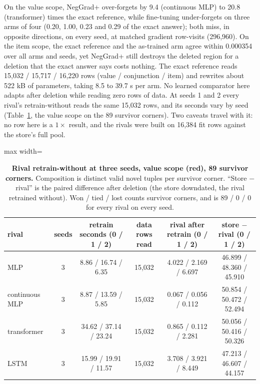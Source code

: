 \documentclass{article} %
\begin{document}
\noindent On the value scope, NegGrad+ over-forgets by 9.4 (continuous MLP) to 20.8 (transformer)
times the exact reference, while fine-tuning under-forgets on three arms of four (0.20, 1.00, 0.23
and 0.29 of the exact answer); both miss, in opposite directions, on every seed, at matched gradient
row-visits (296,960). On the item scope, the exact reference and the as-trained arm agree within
0.000354 over all arms and seeds, yet NegGrad+ still destroys the deleted region for a deletion
that the exact answer says costs nothing. The exact reference reads 15,032 / 15,717 / 16,220 rows
(value / conjunction / item) and rewrites about 522 kB of parameters, taking 8.5 to 39.7 s per
arm. No learned comparator here adapts after deletion while reading zero rows of data.
At seeds 1 and 2 every rival's retrain-without reads the same 15,032 rows, and its seconds vary by
seed (Table~\ref{tab:rivals-del-seeds}, the value scope on the 89 survivor corners). Two caveats
travel with it: no row here is a $1\times$ result, and the rivals were built on 16,384 fit rows
against the store's full pool.

\begin{table}[h]
\centering\small
\caption{\textbf{Rival retrain-without at three seeds, value scope (red), 89 survivor corners.} %
Composition is distinct valid novel tuples per survivor corner. ``Store $-$ rival'' is the paired
difference after deletion (the store downdated, the rival retrained without). Won / tied / lost
counts survivor corners, and is 89 / 0 / 0 for every rival on every seed.} %
\label{tab:rivals-del-seeds}
\setlength{\tabcolsep}{3pt}
\begin{adjustbox}{max width=\linewidth}\begin{tabular}{lccccc}
\toprule
rival & seeds & retrain seconds (0 / 1 / 2) & data rows read & rival after retrain (0 / 1 / 2) & store $-$ rival (0 / 1 / 2) \\
\midrule
MLP & 3 & 8.86 / 16.74 / 6.35 & 15,032 & 4.022 / 2.169 / 6.697 & 46.899 / 48.360 / 45.910 \\
continuous MLP & 3 & 8.87 / 13.59 / 5.85 & 15,032 & 0.067 / 0.056 / 0.112 & 50.854 / 50.472 / 52.494 \\
transformer & 3 & 34.62 / 37.14 / 23.24 & 15,032 & 0.865 / 0.112 / 2.281 & 50.056 / 50.416 / 50.326 \\
LSTM & 3 & 15.99 / 19.91 / 11.57 & 15,032 & 3.708 / 3.921 / 8.449 & 47.213 / 46.607 / 44.157 \\
\bottomrule
\end{tabular}\end{adjustbox}
\end{table}
\end{document}
